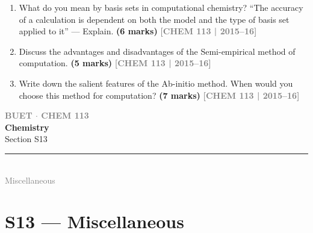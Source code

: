 \documentclass[12pt,a3paper]{article}
\newcommand{\yr}[1]{\hfill\textcolor{gray}{\small\textbf{[#1]}}}
\newcommand{\mk}[1]{\textcolor{orange!70!black}{\small\textbf{(#1 marks)}}}
\newcommand{\secdivider}[4]{%
  \newpage\thispagestyle{empty}%
  \vspace*{\fill}%
  \begin{tcolorbox}[enhanced,colback=#4!7,colframe=#3,boxrule=1.5pt,arc=8pt,
    left=20pt,right=20pt,top=22pt,bottom=22pt,
    shadow={3pt}{-3pt}{0pt}{black!15}]
    \centering
    {\large\textcolor{gray}{\textbf{BUET $\cdot$ CHEM 113}}}\\[8pt]
    {\fontsize{26}{32}\selectfont\bfseries\textcolor{#3}{Chemistry}}\\[6pt]
    {\fontsize{15}{19}\selectfont\textcolor{dgray}{#1}}\\[12pt]
    \textcolor{#3!60}{\rule{0.5\textwidth}{0.5pt}}\\[6pt]
    {\small\textcolor{gray}{#2}}
  \end{tcolorbox}%
  \vspace*{\fill}\newpage%
}
\begin{document}
\begin{enumerate}
\item What do you mean by basis sets in computational chemistry? ``The accuracy of a calculation is dependent on both the model and the type of basis set applied to it'' --- Explain. \mk{6}
\yr{CHEM 113 | 2015--16}



\item Discuss the advantages and disadvantages of the Semi-empirical method of computation. \mk{5}
\yr{CHEM 113 | 2015--16}



\item Write down the salient features of the Ab-initio method. When would you choose this method for computation? \mk{7}
\yr{CHEM 113 | 2015--16}



\end{enumerate}
\newpage


\secdivider{Section S13}{Miscellaneous}{cF}{cF}
\label{sec:S13}
\section{S13 --- Miscellaneous}
\end{document}
